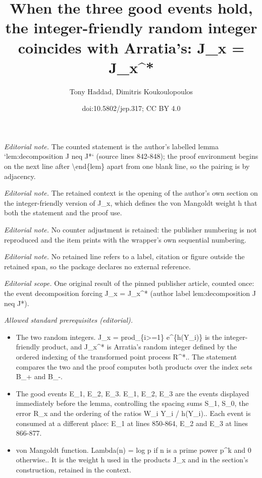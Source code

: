 \documentclass[10pt,a4paper]{article}
\title{When the three good events hold, the integer-friendly random integer coincides with Arratia's: J\_x = J\_x\textasciicircum{}*}
\author{Tony Haddad, Dimitris Koukoulopoulos}
\date{doi:10.5802/jep.317; CC BY 4.0}
\theoremstyle{plain}
\theoremstyle{definition}
\begin{document}
\maketitle
\noindent\textit{Editorial note.} The counted statement is the author's labelled lemma `lem:decomposition J neq J*` (source lines 842-848); the proof environment begins on the next line after \textbackslash{}end\{lem\} apart from one blank line, so the pairing is by adjacency.\par\medskip
\noindent\textit{Editorial note.} The retained context is the opening of the author's own section on the integer-friendly version of J\_x, which defines the von Mangoldt weight h that both the statement and the proof use.\par\medskip
\noindent\textit{Editorial note.} No counter adjustment is retained: the publisher numbering is not reproduced and the item prints with the wrapper's own sequential numbering.\par\medskip
\noindent\textit{Editorial note.} No retained line refers to a label, citation or figure outside the retained span, so the package declares no external reference.\par\medskip
\noindent\textit{Editorial scope.} One original result of the pinned publisher article, counted once: the event decomposition forcing J\_x = J\_x\textasciicircum{}* (author label lem:decomposition J neq J*).\par\medskip
\noindent\textit{Allowed standard prerequisites (editorial).}\begin{itemize}
\item The two random integers. J\_x = prod\_\{i>=1\} e\textasciicircum{}\{h(Y\_i)\} is the integer-friendly product, and J\_x\textasciicircum{}* is Arratia's random integer defined by the ordered indexing of the transformed point process R\textasciicircum{}*.. The statement compares the two and the proof computes both products over the index sets B\_+ and B\_-. 
\item The good events E\_1, E\_2, E\_3. E\_1, E\_2, E\_3 are the events displayed immediately before the lemma, controlling the spacing sums S\_1, S\_0, the error R\_x and the ordering of the ratios W\_i Y\_i / h(Y\_i).. Each event is consumed at a different place: E\_1 at lines 850-864, E\_2 and E\_3 at lines 866-877.
\item von Mangoldt function. Lambda(n) = log p if n is a prime power p\textasciicircum{}k and 0 otherwise.. It is the weight h used in the products J\_x and in the section's construction, retained in the context.
\end{itemize}\medskip
\end{document}

